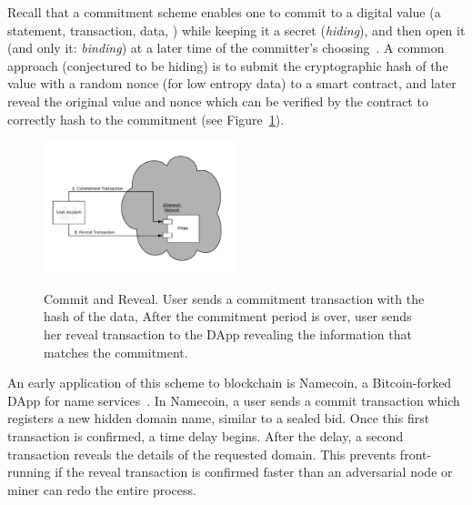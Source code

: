 Recall that a commitment scheme enables one to commit to a digital value (\eg a statement, transaction, data, \etc) while keeping it a secret (\textit{hiding}), and then open it (and only it: \textit{binding}) at a later time of the committer's choosing~\cite{brassard1988minimum}. A common approach (conjectured to be hiding) is to submit the cryptographic hash of the value with a random nonce (for low entropy data) to a smart contract, and later reveal the original value and nonce which can be verified by the contract to correctly hash to the commitment (see Figure~\ref{fig:commitReveal}).

\begin{figure}[h]
    \centering
{\caption[Commit and Reveal mechanism]{Commit and Reveal. User sends a commitment transaction with the hash of the data, After the commitment period is over, user sends her reveal transaction to the DApp revealing the information that matches the commitment.}\label{fig:commitReveal}}
{\includegraphics[width=0.5\textwidth]{figures/commit-reveal.png}}
\end{figure}

An early application of this scheme to blockchain is Namecoin, a Bitcoin-forked DApp for name services~\cite{kalodner2015empirical}. In Namecoin, a user sends a commit transaction which registers a new hidden domain name, similar to a sealed bid. Once this first transaction is confirmed, a time delay begins. After the delay, a second transaction reveals the details of the requested domain. This prevents front-running if the reveal transaction is confirmed faster than an adversarial node or miner can redo the entire process.

